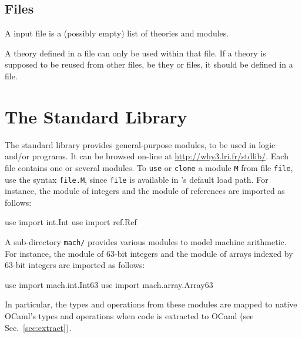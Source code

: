 \subsection{Files}

A \whyml input file is a (possibly empty) list of theories and modules.
\begin{center}\framebox{}\end{center}
A theory defined in a \whyml file can only be used within that
file. If a theory is supposed to be reused from other files, be they
\why or \whyml files, it should be defined in a \why file.


\section{The \why Standard Library}
\label{sec:library}

The \why standard library provides general-purpose
modules, to be used in logic and/or programs.
It can be browsed on-line at \url{http://why3.lri.fr/stdlib/}.
Each file contains one or several modules.
To \texttt{use} or \texttt{clone} a module \texttt{M} from file
\texttt{file}, use the syntax \texttt{file.M}, since \texttt{file} is
available in \why's default load path. For instance, the module of
integers and the module of references are imported as follows:
\begin{whycode}
  use import int.Int
  use import ref.Ref
\end{whycode}
A sub-directory \texttt{mach/} provides various modules to model
machine arithmetic.
For instance, the module of 63-bit integers and the module of arrays
indexed by 63-bit integers are imported as follows:
\begin{whycode}
  use import mach.int.Int63
  use import mach.array.Array63
\end{whycode}
In particular, the types and operations from these modules are mapped
to native OCaml's types and operations when \why code is extracted to
OCaml (see Sec.~\ref{sec:extract}).


